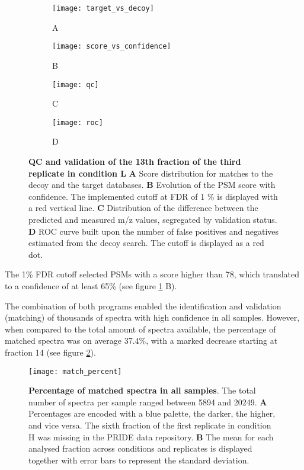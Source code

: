 \begin{figure}[!h]
\centering
\begin{subfigure}{.45\textwidth}
  \centering
  \caption*{A}
  \texttt{[image: target\_vs\_decoy]}
\end{subfigure}
\begin{subfigure}{.45\textwidth}
  \centering
    \caption*{B}
  \texttt{[image: score\_vs\_confidence]}
\end{subfigure}
\bigskip

\begin{subfigure}{.45\textwidth}
  \centering
    \caption*{C}
  \texttt{[image: qc]}
\end{subfigure}
\begin{subfigure}{.45\textwidth}
  \centering
    \caption*{D}
  \texttt{[image: roc]}
\end{subfigure}
\caption[Quality control and validation]{\textbf{QC and validation of the 13th fraction of the third replicate in condition L} \textbf{A} Score distribution for matches to the decoy and the target databases. \textbf{B} Evolution of the PSM score with confidence. The implemented cutoff at FDR of 1 \% is displayed with a red vertical line. \textbf{C} Distribution of the difference between the predicted and measured \ac{m/z} values, segregated by validation status. \textbf{D} ROC curve built upon the number of false positives and negatives estimated from the decoy search. The cutoff is displayed as a red dot.}
\label{figure:qc_validation}
\end{figure}

The 1\% FDR cutoff selected PSMs with a score higher than 78, which translated to a confidence of at least 65\% (see figure \ref{figure:qc_validation} B).


The combination of both programs enabled the identification and validation (matching) of thousands of spectra with high confidence in all samples. However, when compared to the total amount of spectra available, the percentage of matched spectra was on average 37.4\%, with a marked decrease starting at fraction 14 (see figure \ref{fig:match_percent}).

\begin{figure}[!h]
\centering
\texttt{[image: match\_percent]}
\caption[Percentage of matched spectra in all samples]{\textbf{Percentage of matched spectra in all samples}. The total number of spectra per sample ranged between 5894 and 20249. \textbf{A} Percentages are encoded with a blue palette, the darker, the higher, and vice versa. The sixth fraction of the first replicate in condition H was missing in the PRIDE data repository. \textbf{B} The mean for each analysed fraction across conditions and replicates is displayed together with error bars to represent the standard deviation.}
\label{fig:match_percent}
\end{figure}

